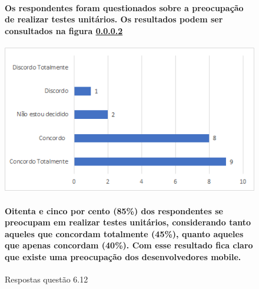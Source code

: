 \begin{figure}[!t]
\centering
\paragraph{Os respondentes foram questionados sobre a preocupação de realizar testes unitários. Os resultados podem ser consultados na figura \ref{fig:6.12}}
\includegraphics[scale=0.7]{figuras das questoes/6.12.png}
\caption{Respostas questão 6.12}
\paragraph{Oitenta e cinco por cento (85{\%}) dos respondentes se preocupam em realizar testes unitários, considerando tanto aqueles que concordam totalmente (45{\%}), quanto aqueles que apenas concordam (40{\%}). Com esse resultado fica claro que existe uma preocupação dos desenvolvedores mobile.}
\label{fig:6.12}
\end{figure}
